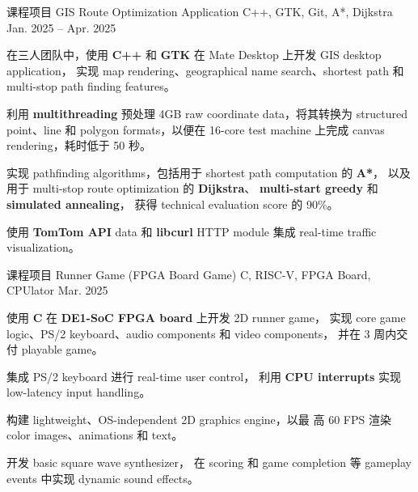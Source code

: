 \begin{cventries}
  \cventry
  {课程项目}
  {GIS Route Optimization Application}
  {C++, GTK, Git, A*, Dijkstra}
  {Jan. 2025 -- Apr. 2025}
  {
    \begin{cvitems}
      \item
            {
                  在三人团队中，使用 \textbf{C++} 和 \textbf{GTK} 在 Mate Desktop 上开发 GIS desktop application，
                  实现 map rendering、geographical name search、shortest path 和 multi-stop path finding features。
            }
      \item
            {
                  利用 \textbf{multithreading} 预处理 4GB raw coordinate data，将其转换为 structured point、line
                  和 polygon formats，以便在 16-core test machine 上完成 canvas rendering，耗时低于 50 秒。
            }
      \item
            {
                  实现 pathfinding algorithms，包括用于 shortest path computation 的 \textbf{A*}，
                  以及用于 multi-stop route optimization 的 \textbf{Dijkstra}、
                  \textbf{multi-start greedy} 和 \textbf{simulated annealing}，
                  获得 technical evaluation score 的 90\%。
            }
      \item
            {
                  使用 \textbf{TomTom API} data 和 \textbf{libcurl} HTTP module 集成 real-time traffic visualization。
            }
    \end{cvitems}
  }

  \cventry
  {课程项目}
  {Runner Game (FPGA Board Game)}
  {C, RISC-V, FPGA Board, CPUlator}
  {Mar. 2025}
  {
    \begin{cvitems}
      \item
            {
                  使用 \textbf{C} 在 \textbf{DE1-SoC FPGA board} 上开发 2D runner game，
                  实现 core game logic、PS/2 keyboard、audio components 和 video components，
                  并在 3 周内交付 playable game。
            }
      \item
            {
                  集成 PS/2 keyboard 进行 real-time user control，
                  利用 \textbf{CPU interrupts} 实现 low-latency input handling。}
      \item
            {
                  构建 lightweight、OS-independent 2D graphics engine，以最
                  高 60 FPS 渲染 color images、animations 和 text。
            }
      \item
            {
                  开发 basic square wave synthesizer，
                  在 scoring 和 game completion 等 gameplay events 中实现 dynamic sound effects。
            }
    \end{cvitems}
  }


\end{cventries}
